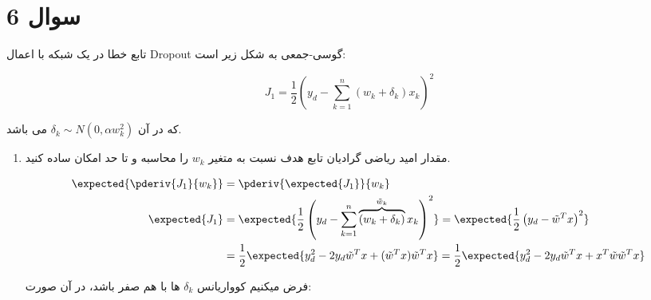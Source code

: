 \section{سوال 6}

تابع خطا در یک شبکه با اعمال Dropout گوسی-جمعی به شکل زیر است:

\[
	J_1=\frac{1}{2}\left(y_d-\sum_{k=1}^{n}(w_k+\delta_k)x_k\right)^2
\]

که در آن $\delta_k\sim N(0,\alpha w_k^2)$ می باشد.

\begin{enumerate}
	\item {
	      مقدار امید ریاضی گرادیان تابع هدف نسبت به متغیر $w_k$ را محاسبه و تا حد امکان ساده کنید.

	      \begin{qsolve}[]
		      \begin{align*}
			      \expected{\pderiv{J_1}{w_k}} & = \pderiv{\expected{J_1}}{w_k} \\
			      \expected{J_1}               & =
			      \expected{
				      \frac{1}{2}\left(y_d-\sum_{k=1}^{n}\overbrace{(w_k+\delta_k)}^{\tilde{w}_k}x_k\right)^2
			      }=\expected{
				      \frac{1}{2}\left(y_d-\tilde{w}^Tx\right)^2
			      }                                                             \\
			                                   & =\frac{1}{2}\expected{
				      y_d^2-2y_d\tilde{w}^Tx+(\tilde{w}^Tx)\tilde{w}^Tx
			      }=\frac{1}{2}\expected{
				      y_d^2-2y_d\tilde{w}^Tx+x^T\tilde{w}\tilde{w}^Tx
			      }
		      \end{align*}

		      فرض میکنیم کوواریانس $\delta_k$ ها با هم صفر باشد، در آن صورت:


\end{qsolve}}
\end{enumerate}
